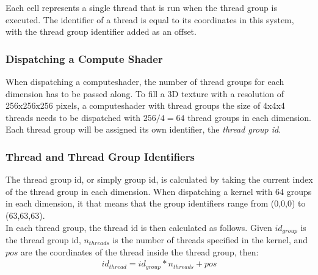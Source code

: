 \begin{figure}[H]
    \label{img:tikz:compute:threads}
\end{figure}
\noindent
Each cell represents a single thread that is run when the thread group is executed.
The identifier of a thread is equal to its coordinates in this system, with the thread group identifier added as an offset.

\subsubsection{Dispatching a Compute Shader}
When dispatching a \gls{computeshader}, the number of thread groups for each dimension has to be passed along.
To fill a 3D texture with a resolution of 256x256x256 pixels, a \gls{computeshader} with thread groups the size of 4x4x4 threads needs to be dispatched with $256 / 4 = 64$ thread groups in each dimension.
\\
Each thread group will be assigned its own identifier, the \emph{thread group id}.

\pagebreak

\subsubsection{Thread and Thread Group Identifiers}
The thread group id, or simply group id, is calculated by taking the current index of the thread group in each dimension.
When dispatching a \gls{kernel} with 64 groups in each dimension, it that means that the group identifiers range from (0,0,0) to (63,63,63).
\\
In each thread group, the thread id is then calculated as follows.
Given $id_{group}$ is the thread group id, $n_{threads}$ is the number of threads specified in the \gls{kernel}, and  $pos$ are the coordinates of the thread inside the thread group, then:
$$
\begin{array}{l}
    id_{thread} = id_{group} * n_{threads} + pos
\end{array}
$$

